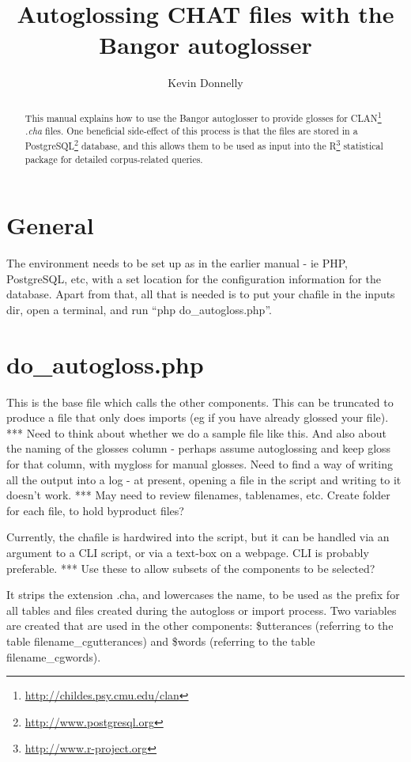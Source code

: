\documentclass[a4paper,10pt]{article}
\title{\textbf{Autoglossing CHAT files with the Bangor autoglosser}}
\author{Kevin Donnelly}
\date{}
\begin{document}
\maketitle

\begin{abstract}
This manual explains how to use the Bangor autoglosser to provide glosses for  CLAN\footnote{\url{http://childes.psy.cmu.edu/clan}} \textit{.cha} files.  One beneficial side-effect of this process is that the files are stored in a PostgreSQL\footnote{\url{http://www.postgresql.org}} database, and this allows them to be used as input into the R\footnote{\url{http://www.r-project.org}} statistical package for detailed corpus-related queries.
\end{abstract}

\section{General}

The environment needs to be set up as in the earlier manual - ie PHP, PostgreSQL, etc, with a set location for the configuration information for the database.  Apart from that, all that is needed is to put your chafile in the inputs dir, open a terminal, and run ``php do\_autogloss.php''.


\section{do\_autogloss.php}

This is the base file which calls the other components.  This can be truncated to produce a file that only does imports (eg if you have already glossed your file).  
*** Need to think about whether we do a sample file like this.  And also about the naming of the glosses column - perhaps assume autoglossing and keep gloss for that column, with mygloss for manual glosses.  Need to find a way of writing all the output into a log - at present, opening a file in the script and writing to it doesn't work.
*** May need to review filenames, tablenames, etc.  Create folder for each file, to hold byproduct files? 

Currently, the chafile is hardwired into the script, but it can be handled via an argument to a CLI script, or via a text-box on a webpage.  CLI is probably preferable.
*** Use these to allow subsets of the components to be selected?

It strips the extension .cha, and lowercases the name, to be used as the prefix for all tables and files created during the autogloss or import process.  Two variables are created that are used in the other components: \$utterances (referring to the table filename\_cgutterances) and \$words (referring to the table filename\_cgwords).
\end{document}
